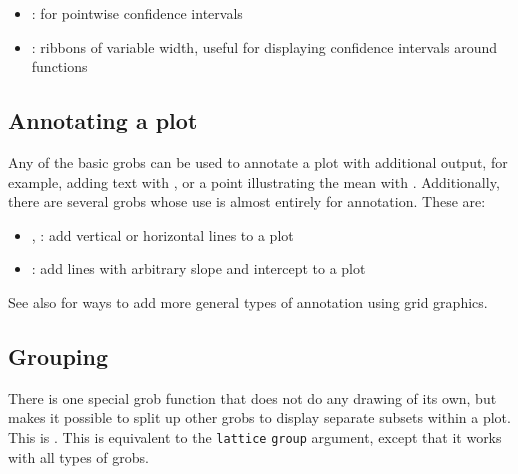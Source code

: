 \begin{itemize}
	\item {}: for pointwise confidence intervals
	\item {}: ribbons of variable width, useful for displaying confidence intervals around functions
\end{itemize}

\subsection{Annotating a plot}\label{sub:annotating_a_plot}

Any of the basic grobs can be used to annotate a plot with additional output, for example, adding text with , or a point illustrating the mean with .  Additionally, there are several grobs whose use is almost entirely for annotation.  These are:

\begin{itemize}
	\item {}, : add vertical or horizontal lines to a plot
	\item {}: add lines with arbitrary slope and intercept to a plot
\end{itemize}

See also  for ways to add more general types of annotation using grid graphics.

\subsection{Grouping}\label{sub:grouping}

There is one special grob function that does not do any drawing of its own, but makes it possible to split up other grobs to display separate subsets within a plot.  This is .  This is equivalent to the {\tt lattice} {\tt group} argument, except that it works with all types of grobs.  

